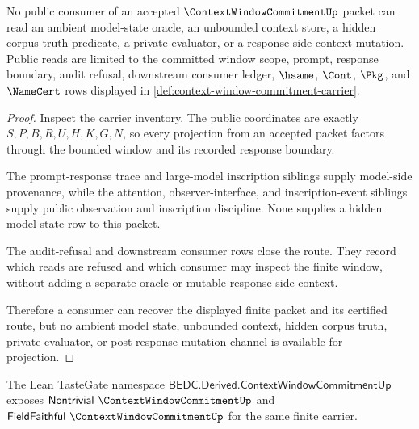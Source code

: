 \begin{theorem}
\label{thm:context-window-commitment-nonescape}
No public consumer of an accepted $\ContextWindowCommitmentUp$ packet can read an ambient model-state oracle, an unbounded context store, a hidden corpus-truth predicate, a private evaluator, or a response-side context mutation. Public reads are limited to the committed window scope, prompt, response boundary, audit refusal, downstream consumer ledger, $\hsame$, $\Cont$, $\Pkg$, and $\NameCert$ rows displayed in \autoref{def:context-window-commitment-carrier}.
\end{theorem}
\begin{proof}
Inspect the carrier inventory. The public coordinates are exactly $S,P,B,R,U,H,K,G,N$, so every projection from an accepted packet factors through the bounded window and its recorded response boundary.

The prompt-response trace and large-model inscription siblings supply model-side provenance, while the attention, observer-interface, and inscription-event siblings supply public observation and inscription discipline. None supplies a hidden model-state row to this packet.

The audit-refusal and downstream consumer rows close the route. They record which reads are refused and which consumer may inspect the finite window, without adding a separate oracle or mutable response-side context.

Therefore a consumer can recover the displayed finite packet and its certified route, but no ambient model state, unbounded context, hidden corpus truth, private evaluator, or post-response mutation channel is available for projection.
\end{proof}



The Lean TasteGate namespace $\mathsf{BEDC.Derived.ContextWindowCommitmentUp}$ exposes $\mathsf{Nontrivial}\ \ContextWindowCommitmentUp$ and $\mathsf{FieldFaithful}\ \ContextWindowCommitmentUp$ for the same finite carrier.

